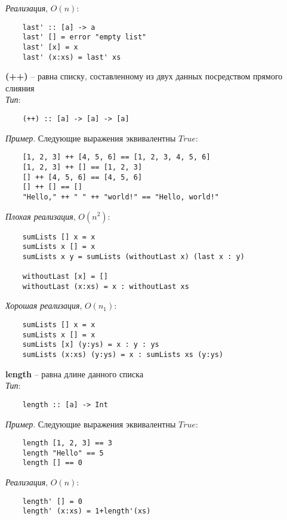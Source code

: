 \documentclass{article}
\begin{document}
	\null\textit{Реализация}, $O(n)$:
	\begin{lstlisting}
	last' :: [a] -> a
	last' [] = error "empty list"
	last' [x] = x
	last' (x:xs) = last' xs
	\end{lstlisting}

	\null\textbf{(++)} -- равна списку, составленному из двух данных посредством прямого слияния\\

	\textit{Тип}:
	\begin{lstlisting}
	(++) :: [a] -> [a] -> [a]
	\end{lstlisting}

	\null\textit{Пример}. Следующие выражения эквивалентны $True$:
	\begin{lstlisting}
	[1, 2, 3] ++ [4, 5, 6] == [1, 2, 3, 4, 5, 6]
	[1, 2, 3] ++ [] == [1, 2, 3]
	[] ++ [4, 5, 6] == [4, 5, 6]
	[] ++ [] == []
	"Hello," ++ " " ++ "world!" == "Hello, world!"
	\end{lstlisting}

	\null\textit{Плохая реализация}, $O(n^2)$:
	\begin{lstlisting}
	sumLists [] x = x
	sumLists x [] = x
	sumLists x y = sumLists (withoutLast x) (last x : y)

	withoutLast [x] = []
	withoutLast (x:xs) = x : withoutLast xs
	\end{lstlisting}

	\null\textit{Хорошая реализация}, $O(n_1)$:
	\begin{lstlisting}
	sumLists [] x = x
	sumLists x [] = x
	sumLists [x] (y:ys) = x : y : ys
	sumLists (x:xs) (y:ys) = x : sumLists xs (y:ys)
	\end{lstlisting}

	\null\textbf{length} -- равна длине данного списка\\

	\textit{Тип}:
	\begin{lstlisting}
	length :: [a] -> Int
	\end{lstlisting}

	\null\textit{Пример}. Следующие выражения эквивалентны $True$:
	\begin{lstlisting}
	length [1, 2, 3] == 3
	length "Hello" == 5
	length [] == 0
	\end{lstlisting}

	\null\textit{Реализация}, $O(n)$:
	\begin{lstlisting}
	length' [] = 0
	length' (x:xs) = 1+length'(xs)
	\end{lstlisting}
\end{document}
